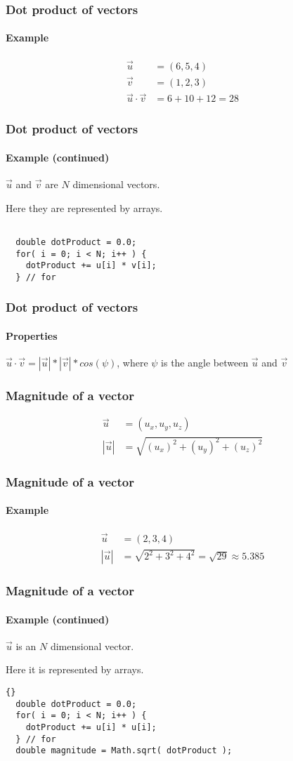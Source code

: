 \documentclass[xcolor=dvipsnames]{beamer}
\begin{document}
\begin{frame}
\frametitle{Dot product of vectors}
\framesubtitle{Example}
  \begin{align*}
    \vec{u} & = (6, 5, 4) \\
    \vec{v} & = (1, 2, 3) \\
    \vec{u} \cdot \vec{v} & = 6 + 10 + 12 = 28
    \end{align*}
  \end{frame}

\begin{frame}[fragile]
\frametitle{Dot product of vectors}
\framesubtitle{Example (continued)}

  $\vec{u}$ and $\vec{v}$ are $N$ dimensional vectors.

  Here they are represented by arrays.


\begin{lstlisting}

  double dotProduct = 0.0;
  for( i = 0; i < N; i++ ) {
    dotProduct += u[i] * v[i];
  } // for

\end{lstlisting}

\end{frame}

\begin{frame}
\frametitle{Dot product of vectors}
\framesubtitle{Properties}

  $\vec{u} \cdot \vec{v} = |\vec{u}| * |\vec{v}| * cos(\psi)$, where $\psi$ is the angle between $\vec{u}$ and $\vec{v}$

  \end{frame}

\begin{frame}
\frametitle{Magnitude of a vector}
  \begin{align*}
    \vec{u} & = (u_x, u_y, u_z) \\
    | \vec{u} | & = \sqrt{(u_x)^2 + (u_y)^2 + (u_z)^2}
    \end{align*}
  \end{frame}

\begin{frame}
\frametitle{Magnitude of a vector}
\framesubtitle{Example}
  \begin{align*}
    \vec{u} & = (2, 3, 4) \\
    | \vec{u} | & = \sqrt{2^2 + 3^2 + 4^2} = \sqrt{29} \approx 5.385
    \end{align*}
  \end{frame}

\begin{frame}[fragile]
\frametitle{Magnitude of a vector}
\framesubtitle{Example (continued)}

  $\vec{u}$ is an $N$ dimensional vector.

  Here it is represented by arrays.

  \begin{lstlisting}{}
  double dotProduct = 0.0;
  for( i = 0; i < N; i++ ) {
    dotProduct += u[i] * u[i];
  } // for
  double magnitude = Math.sqrt( dotProduct );
    \end{lstlisting}

\end{frame}
\end{document}
